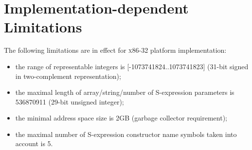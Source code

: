 \chapter{Implementation-dependent Limitations}
\label{sec:limitations}

The following limitations are in effect for \textsc{x86-32} platform implementation:

\begin{itemize}
\item the range of representable integers is [-1073741824..1073741823] (31-bit signed in two-complement representation);
\item the maximal length of array/string/number of S-expression parameters is 536870911 (29-bit unsigned integer);
\item the minimal address space size is 2GB (garbage collector requirement);
\item the maximal number of S-expression constructor name symbols taken into account is 5.
\end{itemize}
